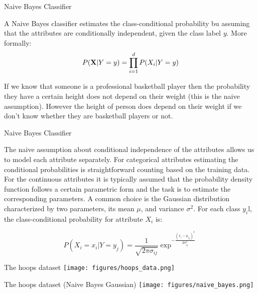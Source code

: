 \documentclass[12pt]{beamer}
\begin{document}
\begin{frame}{Naive Bayes Classifier} 
\begin{definition}
A Naive Bayes classifier estimates the class-conditional probability bu assuming that the attributes are conditionally independent, given the class label $y$. More formally: 
\begin{equation} 
P({\bf X} | Y=y) = \prod_{i=1}^{d} P(X_i | Y=y)
\end{equation}
\end{definition}
\begin{example}
If we know that someone is a professional basketball player then the
probability they have a certain height does not depend on their weight
(this is the naive assumption). However the height of person does
depend on their weight if we don't know whether they are basketball
players or not.

\end{example}
\end{frame}

\begin{frame}{Naive Bayes Classifier} 

The naive assumption about conditional independence of the attributes
allows us to model each attribute separately. For categorical
attributes estimating the conditional probabilities is straightforward
counting based on the training data. For the continuous attributes it
is typically assumed that the probability density function follows a
certain parametric form and the task is to estimate the corresponding
parameters. A common choice is the Gaussian distribution characterized
by two parameters, its mean $\mu$, and variance $\sigma^2$. For each
class $y_i$l, the class-conditional probability for attribute $X_i$
is:

\begin{equation} 
P(X_i = x_i | Y = y_j) =  \frac{1}{\sqrt{2 \pi \sigma_{ij}}} 
\exp^{-\frac{(x_i - \mu_{ij})^2}{2 \sigma_{ij}^2}}
\end{equation} 
\end{frame} 

\begin{frame}{The hoops dataset} 
 \texttt{[image: figures/hoops\_data.png]}
\end{frame} 

\begin{frame}{The hoops dataset (Naive Bayes Gaussian)} 
 \texttt{[image: figures/naive\_bayes.png]}
\end{frame}
\end{document}
